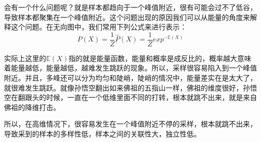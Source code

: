 \documentclass[a4paper]{article}
\begin{document}
会有一个什么问题呢？就是样本都趋向于一个峰值附近，很有可能会过不了低谷，导致样本都聚集在一个峰值附近。这个问题出现的原因我们可以从能量的角度来解释这个问题。在无向图中，我们常用下列公式来进行表示：
\begin{equation}
    P(X) = \frac{1}{Z} \hat{P}(X) = \frac{1}{Z}exp^{-\mathbb{E}(X)}
\end{equation}

实际上这里的$\mathbb{E}(X)$指的就是能量函数，能量和概率是成反比的，概率越大意味着能量越低，能量越低，越难发生跳跃的现象。所以，采样很容易陷入到一个峰值附近。并且，多峰还可以分为均匀和陡峭，陡峭的情况中，能量差实在是太大了，就很难发生跳跃。就像孙悟空翻出如来佛祖的五指山一样，佛祖的维度很好，孙悟空在翻跟头的时候，一直在一个低维里面不同的打转，根本就跳不出来，就是来自佛祖的降维打击。

所以，在高维情况下，很容易发生在一个峰值附近不停的采样，根本就跳不出来，导致采到的样本的多样性低，样本之间的关联性大，独立性低。
\end{document}
